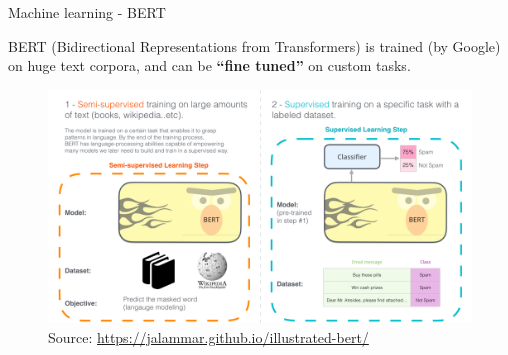 \documentclass[9pt]{beamer}
\begin{document}
\begin{frame}{Machine learning - BERT}

BERT (Bidirectional Representations from Transformers) is trained (by Google) on huge text corpora, and can be \textbf{``fine tuned''} on custom tasks. 

\begin{figure}
	\includegraphics[width=\linewidth]{images/bert-transfer-learning.png}
	\caption{Source: \url{https://jalammar.github.io/illustrated-bert/}}
\end{figure}

\end{frame}






%
%
\end{document}
